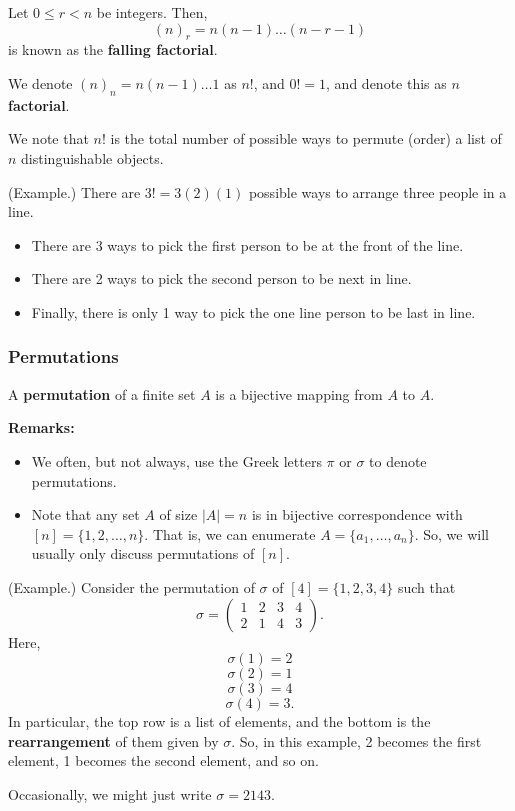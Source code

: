 \documentclass[letterpaper]{article}
\begin{document}
\begin{definition}{}{}
    Let $0 \leq r < n$ be integers. Then, 
    \[(n)_r = n(n - 1) \dots (n - r - 1)\]
    is known as the \textbf{falling factorial}.
\end{definition}

\begin{definition}{}{}
    We denote $(n)_n = n(n - 1) \dots 1$ as $n!$, and $0! = 1$, and denote this as $n$ \textbf{factorial}.
\end{definition}
We note that $n!$ is the total number of possible ways to permute (order) a list of $n$ distinguishable objects. 

\begin{mdframed}[]
    (Example.) There are $3! = 3(2)(1)$ possible ways to arrange three people in a line.
    \begin{itemize}
        \item There are 3 ways to pick the first person to be at the front of the line. 
        \item There are 2 ways to pick the second person to be next in line. 
        \item Finally, there is only 1 way to pick the one line person to be last in line. 
    \end{itemize}
\end{mdframed}

\subsubsection{Permutations}

\begin{definition}{}{}
    A \textbf{permutation} of a finite set $A$ is a bijective mapping from $A$ to $A$. 
\end{definition}
\textbf{Remarks:}
\begin{itemize}
    \item We often, but not always, use the Greek letters $\pi$ or $\sigma$ to denote permutations. 
    \item Note that any set $A$ of size $|A| = n$ is in bijective correspondence with $[n] = \{1, 2, \dots, n\}$. That is, we can enumerate $A = \{a_1, \dots, a_n\}$. So, we will usually only discuss permutations of $[n]$. 
\end{itemize}

\begin{mdframed}[]
    (Example.) Consider the permutation of $\sigma$ of $[4] = \{1, 2, 3, 4\}$ such that 
    \[\sigma = \begin{pmatrix}
        1 & 2 & 3 & 4 \\ 
        2 & 1 & 4 & 3
    \end{pmatrix}.\]
    Here, 
    \[\sigma(1) = 2\]
    \[\sigma(2) = 1\]
    \[\sigma(3) = 4\]
    \[\sigma(4) = 3.\]
    In particular, the top row is a list of elements, and the bottom is the \textbf{rearrangement} of them given by $\sigma$. So, in this example, 2 becomes the first element, 1 becomes the second element, and so on.

    \bigskip 

    Occasionally, we might just write $\sigma = 2143$. 
\end{mdframed}
\end{document}
